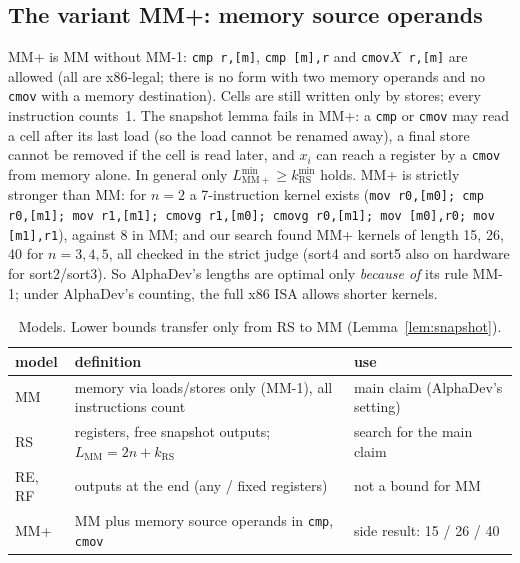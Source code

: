 \subsection{The variant MM+: memory source operands}
MM+ is MM without MM-1: \texttt{cmp r,[m]}, \texttt{cmp [m],r} and \texttt{cmov}$X$\texttt{ r,[m]} are allowed (all are
x86-legal; there is no form with two memory operands and no \texttt{cmov} with a memory destination). Cells are still written
only by stores; every instruction counts~1. The snapshot lemma fails in MM+: a \texttt{cmp} or \texttt{cmov} may read a cell
after its last load (so the load cannot be renamed away), a final store cannot be removed if the cell is read later, and $x_i$
can reach a register by a \texttt{cmov} from memory alone. In general only $L^{\min}_{\mathrm{MM+}} \ge k^{\min}_{\mathrm{RS}}$
holds. MM+ is strictly stronger than MM: for $n = 2$ a 7-instruction kernel exists
(\texttt{mov r0,[m0]; cmp r0,[m1]; mov r1,[m1]; cmovg r1,[m0]; cmovg r0,[m1]; mov [m0],r0; mov [m1],r1}), against 8 in MM;
and our search found MM+ kernels of length 15, 26, 40 for $n = 3, 4, 5$, all checked in the strict judge (sort4 and sort5
also on hardware \pending{} for sort2/sort3).
So AlphaDev's lengths are optimal only \emph{because of} its rule MM-1; under AlphaDev's counting, the full x86 ISA allows
shorter kernels.

\begin{table}[h]\centering\small
\begin{tabular}{lp{7.2cm}p{4.6cm}}\toprule
model & definition & use \\\midrule
MM & memory via loads/stores only (MM-1), all instructions count & main claim (AlphaDev's setting) \\
RS & registers, free snapshot outputs; $L_{\mathrm{MM}} = 2n + k_{\mathrm{RS}}$ & search for the main claim \\
RE, RF & outputs at the end (any / fixed registers) & not a bound for MM \\
MM+ & MM plus memory source operands in \texttt{cmp}, \texttt{cmov} & side result: 15 / 26 / 40 \\\bottomrule
\end{tabular}
\caption{Models. Lower bounds transfer only from RS to MM (Lemma~\ref{lem:snapshot}).}
\end{table}

